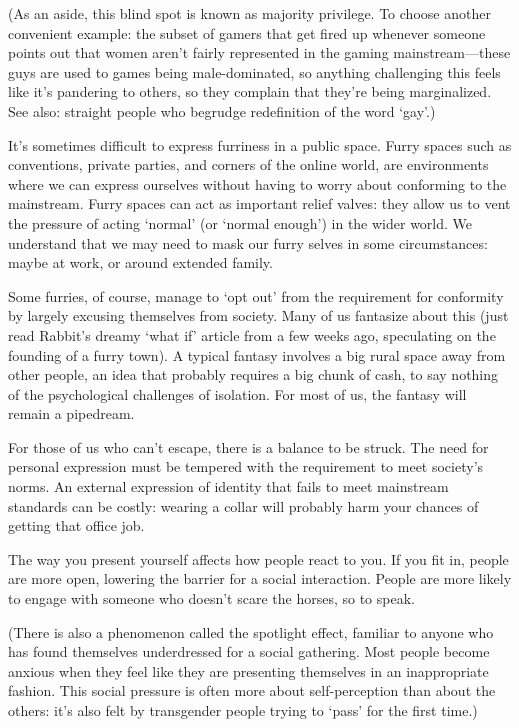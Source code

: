 (As an aside, this blind spot is known as majority privilege. To choose another convenient example: the subset of gamers that get fired up whenever someone points out that women aren't fairly represented in the gaming mainstream—these guys are used to games being male-dominated, so anything challenging this feels like it's pandering to others, so they complain that they're being marginalized. See also: straight people who begrudge redefinition of the word `gay'.)

It's sometimes difficult to express furriness in a public space. Furry spaces such as conventions, private parties, and corners of the online world, are environments where we can express ourselves without having to worry about conforming to the mainstream. Furry spaces can act as important relief valves: they allow us to vent the pressure of acting `normal' (or `normal enough') in the wider world. We understand that we may need to mask our furry selves in some circumstances: maybe at work, or around extended family.

Some furries, of course, manage to `opt out' from the requirement for conformity by largely excusing themselves from society. Many of us fantasize about this (just read Rabbit's dreamy `what if' article from a few weeks ago, speculating on the founding of a furry town). A typical fantasy involves a big rural space away from other people, an idea that probably requires a big chunk of cash, to say nothing of the psychological challenges of isolation. For most of us, the fantasy will remain a pipedream.

For those of us who can't escape, there is a balance to be struck. The need for personal expression must be tempered with the requirement to meet society's norms. An external expression of identity that fails to meet mainstream standards can be costly: wearing a collar will probably harm your chances of getting that office job.

The way you present yourself affects how people react to you. If you fit in, people are more open, lowering the barrier for a social interaction. People are more likely to engage with someone who doesn't scare the horses, so to speak.

(There is also a phenomenon called the spotlight effect, familiar to anyone who has found themselves underdressed for a social gathering. Most people become anxious when they feel like they are presenting themselves in an inappropriate fashion. This social pressure is often more about self-perception than about the others: it's also felt by transgender people trying to `pass' for the first time.)

